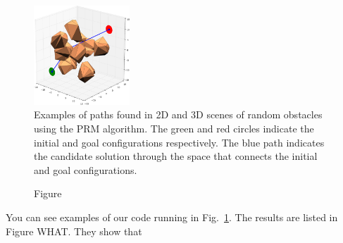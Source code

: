 \documentclass[12pt]{article}
\newcommand{\Function}[1]{\ensuremath{{\small \textsc{#1}}}}
\newcommand{\Var}[1]{\ensuremath{{\small{\textsl{#1}}}}}
\begin{document}
\begin{figure}[h!]
    \includegraphics[width=0.32\textwidth]{3d_example_3.pdf}
    \caption{Examples of paths found in 2D and 3D scenes of random obstacles
    using the PRM algorithm. The green and red circles indicate the initial
    and goal configurations respectively. The blue path indicates the candidate
    solution through the space that connects the initial and goal
    configurations.}
    \label{fig:examples}
\end{figure}

\begin{figure}[h!]
    \centering
    \caption{Figure}
\end{figure}

You can see examples of our code running in Fig.~\ref{fig:examples}. The
results are listed in Figure WHAT. They show that 

\end{document}
